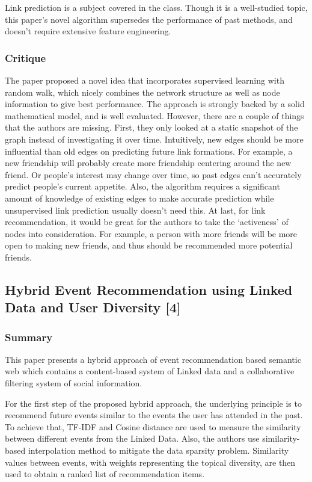 \documentclass{article}
\begin{document}
Link prediction is a subject covered in the class. Though it is a well-studied topic, this paper’s novel algorithm supersedes the performance of past methods, and doesn’t require extensive feature engineering. 

\subsubsection{Critique}
The paper proposed a novel idea that incorporates supervised learning with random walk, which nicely combines the network structure as well as node information to give best performance. The approach is strongly backed by a solid mathematical model, and is well evaluated. However, there are a couple of things that the authors are missing. First, they only looked at a static snapshot of the graph instead of investigating it over time. Intuitively, new edges should be more influential than old edges on predicting future link formations. For example, a new friendship will probably create more friendship centering around the new friend. Or people’s interest may change over time, so past edges can’t accurately predict people’s current appetite. Also, the algorithm requires a significant amount of knowledge of existing edges to make accurate prediction while unsupervised link prediction usually doesn’t need this. At last, for link recommendation, it would be great for the authors to take the ‘activeness’ of nodes into consideration. For example, a person with more friends will be more open to making new friends, and thus should be recommended more potential friends.

\subsection{Hybrid Event Recommendation using Linked Data and User Diversity [4]}
\subsubsection{Summary}
This paper presents a hybrid approach of event recommendation based semantic web which contains a content-based system of Linked data and a collaborative filtering system of social information.

For the first step of the proposed hybrid approach, the underlying principle is to recommend future events similar to the events the user has attended in the past. To achieve that, TF-IDF and Cosine distance are used to measure the similarity between different events from the Linked Data. Also, the authors use similarity-based interpolation method to mitigate the data sparsity problem. Similarity values between events, with weights representing the topical diversity, are then used to obtain a ranked list of recommendation items.
\end{document}
